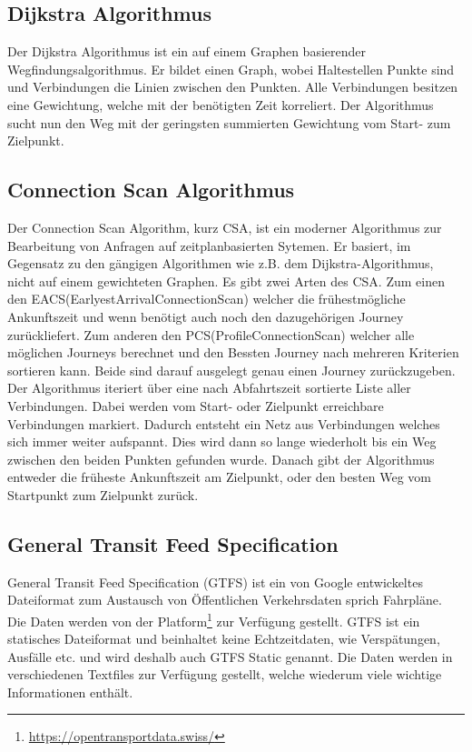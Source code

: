 \subsection{Dijkstra Algorithmus}
Der Dijkstra Algorithmus ist ein auf einem Graphen basierender Wegfindungsalgorithmus. Er bildet einen Graph, wobei Haltestellen Punkte sind und Verbindungen die Linien zwischen den Punkten. Alle Verbindungen besitzen eine Gewichtung, welche mit der benötigten Zeit korreliert. Der Algorithmus sucht nun den Weg mit der geringsten summierten Gewichtung vom Start- zum Zielpunkt.

\subsection{Connection Scan Algorithmus}
Der Connection Scan Algorithm, kurz CSA,  ist ein moderner Algorithmus zur Bearbeitung von Anfragen auf zeitplanbasierten Sytemen. Er basiert, im Gegensatz zu den gängigen Algorithmen wie z.B. dem Dijkstra-Algorithmus, nicht auf einem gewichteten Graphen. 
Es gibt zwei Arten des CSA. Zum einen den EACS(EarlyestArrivalConnectionScan) welcher die frühestmögliche Ankunftszeit und wenn benötigt auch noch den dazugehörigen Journey zurückliefert. Zum anderen den PCS(ProfileConnectionScan) welcher alle möglichen Journeys berechnet und den Bessten Journey nach mehreren Kriterien sortieren kann. Beide sind darauf ausgelegt genau einen Journey zurückzugeben.
Der Algorithmus iteriert über eine nach Abfahrtszeit sortierte Liste aller Verbindungen. Dabei werden vom Start- oder Zielpunkt erreichbare Verbindungen markiert. Dadurch entsteht ein Netz aus Verbindungen welches sich immer weiter aufspannt. Dies wird dann so lange wiederholt bis ein Weg zwischen den beiden Punkten gefunden wurde. Danach gibt der Algorithmus entweder die früheste Ankunftszeit am Zielpunkt, oder den besten Weg vom Startpunkt zum Zielpunkt zurück.




 

\subsection{General Transit Feed Specification}
General Transit Feed Specification (GTFS) ist ein von Google entwickeltes Dateiformat zum Austausch von Öffentlichen Verkehrsdaten sprich Fahrpläne. Die Daten werden von der Platform\footnote{\url{https://opentransportdata.swiss/}} zur Verfügung gestellt. GTFS ist ein statisches Dateiformat und beinhaltet keine Echtzeitdaten, wie Verspätungen, Ausfälle etc. und wird deshalb auch GTFS Static genannt. Die Daten werden in verschiedenen Textfiles zur Verfügung gestellt, welche wiederum viele wichtige Informationen enthält.\newline

